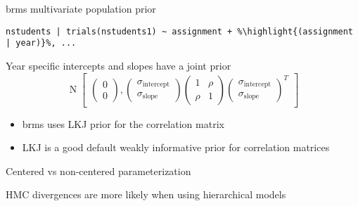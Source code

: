 \documentclass[finnish,english,t]{beamer}
\newcommand{\reducedstrut}{\vrule width 0pt height .9\ht\strutbox depth .9\dp\strutbox\relax}
\newcommand{\highlight}[1]{%
  \begingroup
  \setlength{\fboxsep}{0pt}%
  \colorbox{yellow!30}{\reducedstrut\detokenize{#1}\/}%
  \endgroup
}
\DeclareMathOperator{\N}{N}
\begin{document}
\begin{frame}[fragile]{brms multivariate population prior}

  \vspace{-0.5\baselineskip}
\begin{verbatim}
nstudents | trials(nstudents1) ~ assignment + %\highlight{(assignment | year)}%, ...
\end{verbatim}

  Year specific intercepts and slopes have a joint prior
$$
  \N
\begin{bmatrix}
  \begin{pmatrix}
    0\\0
  \end{pmatrix},
\begin{pmatrix}\sigma_\mathrm{intercept} \\ \sigma_\mathrm{slope}\end{pmatrix}
\begin{pmatrix}1 & \rho \\ \rho & 1\end{pmatrix}
\begin{pmatrix}\sigma_\mathrm{intercept} \\ \sigma_\mathrm{slope} \end{pmatrix}^T
\end{bmatrix}
$$

\begin{itemize}
\item brms uses LKJ prior for the correlation matrix
\item LKJ is a good default weakly informative prior for correlation matrices
\end{itemize}
\end{frame}




\begin{frame}[fragile]{Centered vs non-centered parameterization}

\vspace{-0.5\baselineskip}
HMC divergences are more likely when using hierarchical models

\end{frame}
\end{document}
